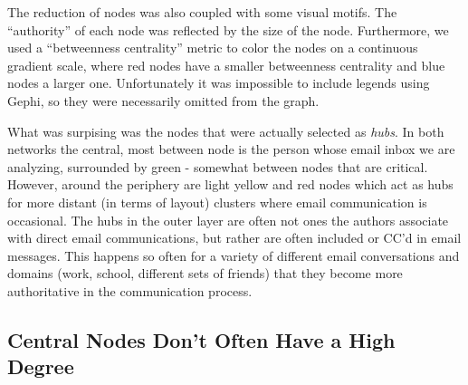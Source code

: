 \documentclass[11pt,letterpaper]{article}
\begin{document}
The reduction of nodes was also coupled with some visual motifs. The ``authority'' of each node was reflected by the size of the node. Furthermore, we used a ``betweenness centrality'' metric to color the nodes on a continuous gradient scale, where red nodes have a smaller betweenness centrality and blue nodes a larger one. Unfortunately it was impossible to include legends using Gephi, so they were necessarily omitted from the graph.

What was surpising was the nodes that were actually selected as \textit{hubs}. In both networks the central, most between node is the person whose email inbox we are analyzing, surrounded by green - somewhat between nodes that are critical. However, around the periphery are light yellow and red nodes which act as hubs for more distant (in terms of layout) clusters where email communication is occasional. The hubs in the outer layer are often not ones the authors associate with direct email communications, but rather are often included or CC'd in email messages. This happens so often for a variety of different email conversations and domains (work, school, different sets of friends) that they become more authoritative in the communication process.

\subsection*{Central Nodes Don't Often Have a High Degree}
\end{document}
